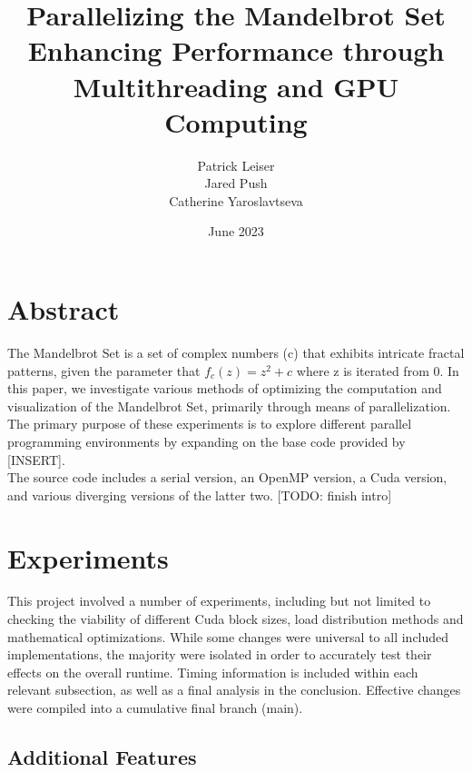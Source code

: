 \documentclass{article}
\begin{document}
\title{\textbf{Parallelizing the Mandelbrot Set \\ \large Enhancing Performance through Multithreading and GPU Computing}}
\author{\begin{tabular}{cc}Patrick Leiser\\
Jared Push\\Catherine Yaroslavtseva\\\end{tabular}}

\date{June 2023}

\maketitle

\section{Abstract}

The Mandelbrot Set is a set of complex numbers (c) that exhibits intricate fractal patterns, given the parameter that $f_c(z) = z^2 + c$ where z is iterated from 0. In this paper, we investigate various methods of optimizing  the computation and visualization of the Mandelbrot Set, primarily through means of parallelization. The primary purpose of these experiments is to explore different parallel programming environments by expanding on the base code provided by [INSERT]. \\ 

The source code includes a serial version, an OpenMP version, a Cuda version, and various diverging versions of the latter two. [TODO: finish intro]

\section{Experiments}

This project involved a number of experiments, including but not limited to checking the viability of different Cuda block sizes, load distribution methods and mathematical optimizations. While some changes were universal to all included implementations, the majority were isolated in order to accurately test their effects on the overall runtime. Timing information is included within each relevant subsection, as well as a final analysis in the conclusion. Effective changes were compiled into a cumulative final branch (main).

\subsection{Additional Features}
\end{document}
